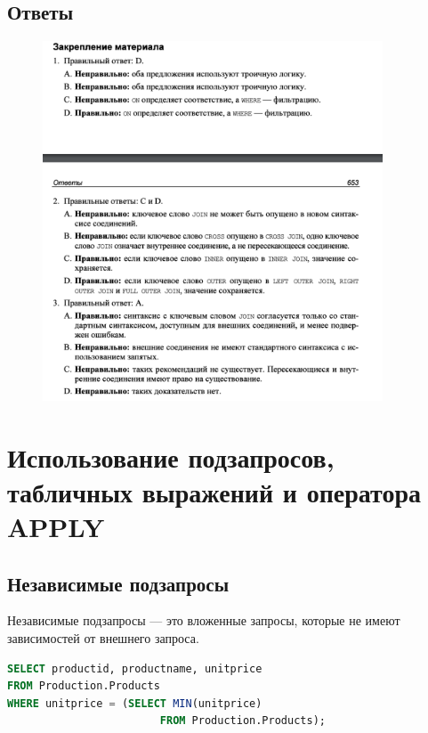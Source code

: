 \subsection*{Ответы}

\begin{figure}[h!]
	\begin{center}
		\includegraphics[width=0.9\textwidth]{img/ans8.png}
	\end{center}
	\captionsetup{justification=centering}
\end{figure}
\clearpage


\section{Использование подзапросов, табличных выражений и оператора APPLY}

\subsection{Независимые подзапросы}
Независимые подзапросы — это вложенные запросы, которые не имеют зависимостей от внешнего запроса.


\begin{lstlisting}[label=lst:funcReturn, caption=Пример вложенного подзапроса, language=sql]
SELECT productid, productname, unitprice
FROM Production.Products
WHERE unitprice = (SELECT MIN(unitprice)
						FROM Production.Products); 
\end{lstlisting}


